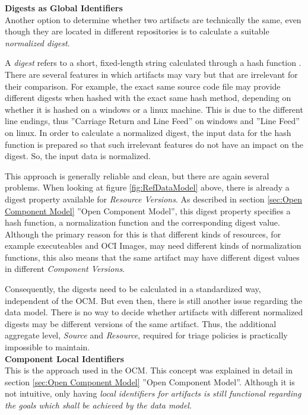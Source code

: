 \noindent\textbf{Digests as Global Identifiers}\\
Another option to determine whether two artifacts are technically the same, even though they are located in different repositories is to calculate a suitable \emph{normalized digest}.\par 
A \emph{digest} refers to a short, fixed-length string calculated through a hash function \cite{Cryptography}. There are several features in which artifacts may vary but that are irrelevant for their comparison. For example, the exact same source code file may provide different digests when hashed with the exact same hash method, depending on whether it is hashed on a windows or a linux machine. This is due to the different line endings, thus ''Carriage Return and Line Feed'' on windows and ''Line Feed'' on linux. In order to calculate a normalized digest, the input data for the hash function is prepared so that such irrelevant features do not have an impact on the digest. So, the input data is normalized.\par
This approach is generally reliable and clean, but there are again several problems. When looking at figure \ref{fig:RefDataModel} above, there is already a digest property available for \emph{Resource Versions}. As described in section \ref{sec:Open Component Model} ''Open Component Model'', this digest property specifies a hash function, a normalization function and the corresponding digest value. Although the primary reason for this is that different kinds of resources, for example executeables and OCI Images, may need different kinds of normalization functions, this also means that the same artifact may have different digest values in different \emph{Component Versions}.\par
Consequently, the digests need to be calculated in a standardized way, independent of the OCM. But even then, there is still another issue regarding the data model. There is no way to decide whether artifacts with different normalized digests may be different versions of the same artifact. Thus, the additional aggregate level, \emph{Source} and \emph{Resource}, required for triage policies is practically impossible to maintain.\\

\noindent\textbf{Component Local Identifiers}\\
This is the approach used in the OCM. This concept was explained in detail in section \ref{sec:Open Component Model} ''Open Component Model''. Although it is not intuitive, only having \emph{local identifiers for artifacts is still functional regarding the goals which shall be achieved by the data model}.

